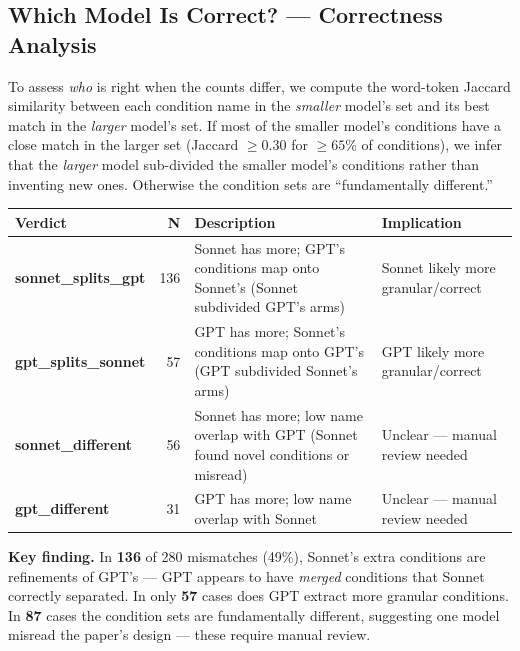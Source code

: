 \documentclass[11pt,a4paper]{article}
\begin{document}
        \subsection{Which Model Is Correct? --- Correctness Analysis}

        To assess \emph{who} is right when the counts differ, we compute the
        word-token Jaccard similarity between each condition name in the
        \emph{smaller} model's set and its best match in the \emph{larger} model's set.
        If most of the smaller model's conditions have a close match in the larger set
        (Jaccard $\geq 0.30$ for $\geq 65\%$ of conditions), we infer that the
        \emph{larger} model sub-divided the smaller model's conditions rather than
        inventing new ones. Otherwise the condition sets are ``fundamentally different.''

        \begin{center}\small
\begin{tabular}{lrp{6cm}p{4.5cm}}
\toprule
\textbf{Verdict} & \textbf{N} & \textbf{Description} & \textbf{Implication} \\
\midrule
\textbf{sonnet\_splits\_gpt} & 136 & Sonnet has more; GPT's conditions map onto Sonnet's (Sonnet subdivided GPT's arms) & Sonnet likely more granular/correct \\[2pt]
\textbf{gpt\_splits\_sonnet} & 57 & GPT has more; Sonnet's conditions map onto GPT's (GPT subdivided Sonnet's arms) & GPT likely more granular/correct \\[2pt]
\textbf{sonnet\_different} & 56 & Sonnet has more; low name overlap with GPT (Sonnet found novel conditions or misread) & Unclear --- manual review needed \\[2pt]
\textbf{gpt\_different} & 31 & GPT has more; low name overlap with Sonnet & Unclear --- manual review needed \\[2pt]
\bottomrule
\end{tabular}
\end{center}

        \medskip
        \textbf{Key finding.}
        In \textbf{136} of 280 mismatches (49\%),
        Sonnet's extra conditions are refinements of GPT's --- GPT appears to have
        \emph{merged} conditions that Sonnet correctly separated.
        In only \textbf{57} cases does GPT extract more granular conditions.
        In \textbf{87} cases the condition sets are
        fundamentally different, suggesting one model misread the paper's design
        --- these require manual review.
\end{document}
